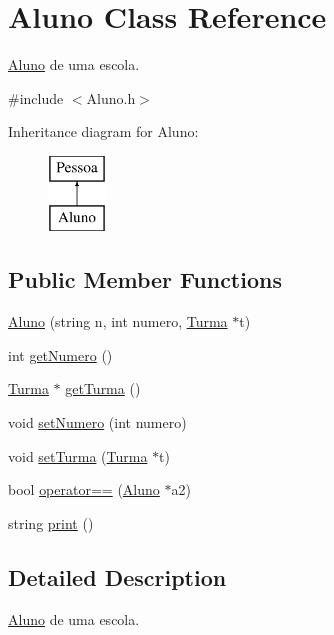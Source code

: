 \hypertarget{class_aluno}{\section{Aluno Class Reference}
\label{class_aluno}
}


\hyperlink{class_aluno}{Aluno} de uma escola.  




{\ttfamily \#include $<$Aluno.\-h$>$}

Inheritance diagram for Aluno\-:\begin{figure}[H]
\begin{center}
\leavevmode
\includegraphics[height=2.000000cm]{class_aluno}
\end{center}
\end{figure}
\subsection*{Public Member Functions}
\begin{DoxyCompactItemize}
\item 
\hyperlink{class_aluno_afa2d1a87c5d62a63381065ee0cf2ea7f}{Aluno} (string n, int numero, \hyperlink{class_turma}{Turma} $\ast$t)
\item 
int \hyperlink{class_aluno_a258e8f5c3dbc8b19efadaf20ba48874f}{get\-Numero} ()
\item 
\hyperlink{class_turma}{Turma} $\ast$ \hyperlink{class_aluno_a1f3d823c2589d39d930738689707ba3d}{get\-Turma} ()
\item 
void \hyperlink{class_aluno_a36ad83483a9e0c247d7092a95607758c}{set\-Numero} (int numero)
\item 
void \hyperlink{class_aluno_a5403cd3d2d1a219f9aa49bc53825d4fc}{set\-Turma} (\hyperlink{class_turma}{Turma} $\ast$t)
\item 
bool \hyperlink{class_aluno_a70c5a814dcd56edc12bbe2c00aa3a7a6}{operator==} (\hyperlink{class_aluno}{Aluno} $\ast$a2)
\item 
string \hyperlink{class_aluno_ac5c1bdeaea70f418dd7aa1b0c73160aa}{print} ()
\end{DoxyCompactItemize}


\subsection{Detailed Description}
\hyperlink{class_aluno}{Aluno} de uma escola. 

